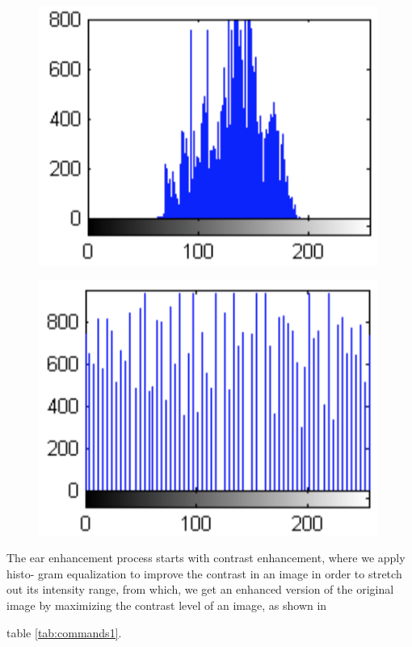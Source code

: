 \begin{figure}
\centering
\begin{minipage}{.5\textwidth}
  \centering
  \includegraphics[width=.4\linewidth]{Figures/Figure5}
  \label{fig:test1}
\end{minipage}%
\begin{minipage}{.5\textwidth}
  \centering
  \includegraphics[width=.4\linewidth]{Figures/Figure6}
  \label{fig:test2}
\end{minipage}
\end{figure}



The ear enhancement process starts with contrast enhancement, where we apply histo- gram equalization to improve the contrast in an image in order to stretch out its intensity range, from which, we get an enhanced version of the original image by maximizing the contrast level of an image, as shown in


 table \ref{tab:commands1}.

